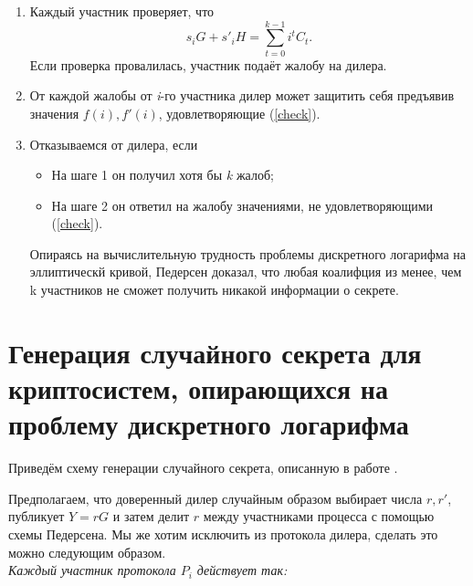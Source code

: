 \begin{enumerate}
    \item Каждый участник проверяет, что 
    \begin{equation}\label{check}
        s_iG + s'_iH = \sum_{t=0}^{k-1}i^tC_t. 
    \end{equation}
     Если проверка провалилась, участник подаёт жалобу на дилера.
     \item От каждой жалобы от \textit{i}-го участника дилер может защитить себя предъявив значения $f(i), f'(i)$, удовлетворяющие (\ref{check}).
     \item Отказываемся от дилера, если
     \begin{itemize}
         \item На шаге 1 он получил хотя бы \textit{k} жалоб;
         \item На шаге 2 он ответил на жалобу значениями, не удовлетворяющими (\ref{check}).
     \end{itemize}

     Опираясь на вычислительную трудность проблемы дискретного логарифма на эллиптическй кривой, Педерсен доказал, что любая коалифция из менее, чем k участников не сможет получить никакой информации о секрете.
\end{enumerate}

\section{Генерация случайного секрета для криптосистем, опирающихся на проблему дискретного логарифма}

Приведём схему генерации случайного секрета, описанную в работе \cite{Gen}.

Предполагаем, что доверенный дилер случайным образом выбирает числа $r, r'$, публикует $Y = rG$ и затем делит $r$ между участниками процесса с помощью схемы Педерсена. Мы же хотим исключить из протокола дилера, сделать это можно следующим образом.\\

\textit{Каждый участник протокола $P_i$ действует так:}

